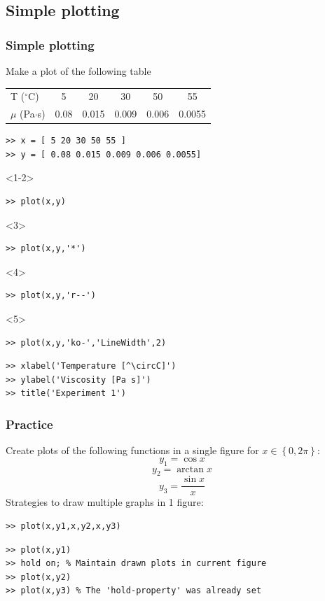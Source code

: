 \documentclass[11pt,table,final,fleqn,xcolor={usenames,dvipsnames},unknownkeysallowed,handout]{beamer}
\begin{document}
\subsection*{Simple plotting}
\begin{frame}[fragile]
  \frametitle{Simple plotting}
  Make a plot of the following table
   \begin{longtable}{l!{\vrule}ccccc}
      T ($^\circ$C) & 5   &  20  & 30   & 50   & 55 \\
      $\mu$ (Pa$\cdot$s)  & 0.08& 0.015& 0.009& 0.006& 0.0055 \\
    \end{longtable} \pause
  \begin{lstlisting}
>> x = [ 5 20 30 50 55 ]
>> y = [ 0.08 0.015 0.009 0.006 0.0055]
\end{lstlisting}
\begin{onlyenv}<1-2>
  \begin{lstlisting}
>> plot(x,y)
  \end{lstlisting}
\end{onlyenv}
\begin{onlyenv}<3>
  \begin{lstlisting}
>> plot(x,y,'*')
  \end{lstlisting}
\end{onlyenv}
\begin{onlyenv}<4>
  \begin{lstlisting}
>> plot(x,y,'r--')
  \end{lstlisting}
\end{onlyenv}
\begin{onlyenv}<5>
  \begin{lstlisting}
>> plot(x,y,'ko-','LineWidth',2)
  \end{lstlisting}
\end{onlyenv}
\begin{lstlisting}
>> xlabel('Temperature [^\circC]')
>> ylabel('Viscosity [Pa s]')
>> title('Experiment 1')
  \end{lstlisting}
\end{frame}

\begin{frame}[fragile]
 \frametitle{Practice}
 Create plots of the following functions in a single figure for $x \in \left\{0,2\pi\right\}$:
  \[
    y_1 = \cos x 
  \]
  \[
    y_2 = \arctan x 
  \]
  \[
    y_3 = \frac{\sin x }{x}
  \]
  \pause
  Strategies to draw multiple graphs in 1 figure:
 \begin{lstlisting}
>> plot(x,y1,x,y2,x,y3)
 \end{lstlisting}
  \begin{lstlisting}
>> plot(x,y1)
>> hold on; % Maintain drawn plots in current figure
>> plot(x,y2)
>> plot(x,y3) % The 'hold-property' was already set
  \end{lstlisting}
\end{frame}
\end{document}
